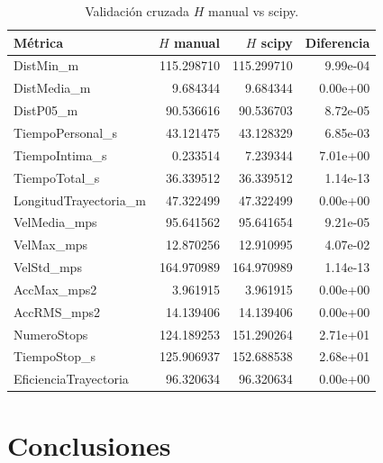 \documentclass[12pt,a4paper,oneside]{book}
\begin{document}
\begin{table}[H]
\centering
\caption{Validación cruzada $H$ manual vs scipy.}
\small
\begin{tabular}{lrrr}
\toprule
\textbf{Métrica} & \textbf{$H$ manual} & \textbf{$H$ scipy} & \textbf{Diferencia} \\
\midrule
DistMin\_m & 115.298710 & 115.299710 & 9.99e-04 \\
DistMedia\_m & 9.684344 & 9.684344 & 0.00e+00 \\
DistP05\_m & 90.536616 & 90.536703 & 8.72e-05 \\
TiempoPersonal\_s & 43.121475 & 43.128329 & 6.85e-03 \\
TiempoIntima\_s & 0.233514 & 7.239344 & 7.01e+00 \\
TiempoTotal\_s & 36.339512 & 36.339512 & 1.14e-13 \\
LongitudTrayectoria\_m & 47.322499 & 47.322499 & 0.00e+00 \\
VelMedia\_mps & 95.641562 & 95.641654 & 9.21e-05 \\
VelMax\_mps & 12.870256 & 12.910995 & 4.07e-02 \\
VelStd\_mps & 164.970989 & 164.970989 & 1.14e-13 \\
AccMax\_mps2 & 3.961915 & 3.961915 & 0.00e+00 \\
AccRMS\_mps2 & 14.139406 & 14.139406 & 0.00e+00 \\
NumeroStops & 124.189253 & 151.290264 & 2.71e+01 \\
TiempoStop\_s & 125.906937 & 152.688538 & 2.68e+01 \\
EficienciaTrayectoria & 96.320634 & 96.320634 & 0.00e+00 \\
\bottomrule
\end{tabular}
\end{table}

\section{Conclusiones}
\end{document}
